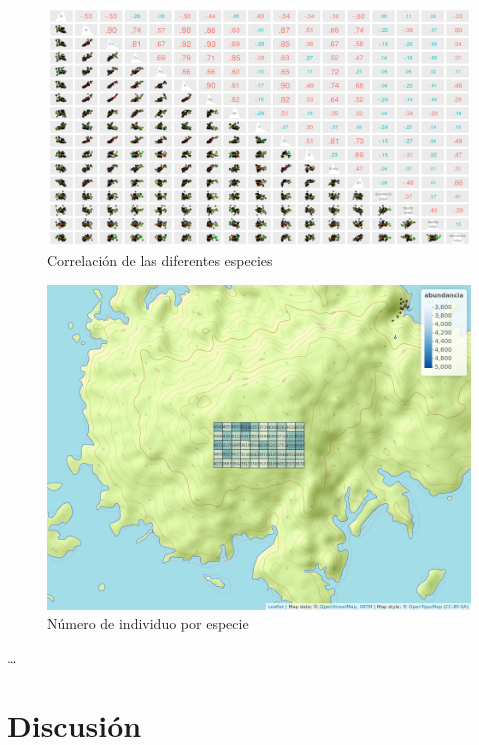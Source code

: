 \documentclass[11pt,]{article}
\begin{document}
\begin{figure}
\centering
\includegraphics[width=1.10000\textwidth]{matriz_correlacion_suelo_abun_riq_spearman.png}
\caption{Correlación de las diferentes especies\label{ambiente}}
\end{figure}

\begin{figure}
\centering
\includegraphics[width=1.10000\textwidth]{mapa_cuadros_abun_global.png}
\caption{Número de individuo por especie\label{riquezas}}
\end{figure}

\ldots

\section{Discusión}\label{discusiuxf3n}
\end{document}
